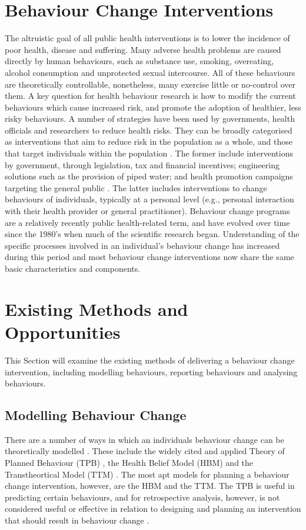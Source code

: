\section{Behaviour Change Interventions}
The altruistic goal of all public health interventions is to lower the incidence of poor health, disease and suffering. Many adverse health problems are caused directly by human behaviours, such as substance use, smoking, overeating, alcohol consumption and unprotected sexual intercourse. All of these behaviours are theoretically controllable, nonetheless, many exercise little or no-control over them. A key question for health behaviour research is how to modify the current behaviours which cause increased risk, and promote the adoption of healthier, less risky behaviours.
A number of strategies have been used by governments, health officials and researchers to reduce health risks. They can be broadly categorised as interventions that aim to reduce risk in the population as a whole, and those that target individuals within the population \cite{Guilbert2003}. The former include interventions by government, through legislation, tax and financial incentives; engineering solutions such as the provision of piped water; and health promotion campaigns targeting the general public \cite{Guilbert2003}. The latter includes interventions to change behaviours of individuals, typically at a personal level (e.g., personal interaction with their health provider or general practitioner).
Behaviour change programs are a relatively recently public health-related term, and have evolved over time since the 1980's when much of the scientific research began. Understanding of the specific processes involved in an individual's behaviour change has increased during this period and most behaviour change interventions now share the same basic characteristics and components.

\section{Existing Methods and Opportunities}
This Section will examine the existing methods of delivering a behaviour change intervention, including modelling behaviours, reporting behaviours and analysing behaviours.

\subsection{Modelling Behaviour Change}
There are a number of ways in which an individuals behaviour change can be theoretically modelled \cite{Morris2012a}. These include the widely cited and applied Theory of Planned Behaviour (TPB) \cite{Ajzen1985}, the Health Belief Model (HBM) \cite{Hochbaum1958, Sharma2012} and the Transtheortical Model (TTM) \cite{Prochaska2005, Prochaska2013}. The most apt models for planning a behaviour change intervention, however, are the HBM and the TTM. The TPB is useful in predicting certain behaviours, and for retrospective analysis, however, is not considered useful or effective in relation to designing and planning an intervention that should result in behaviour change \cite{Hardeman2002}.

